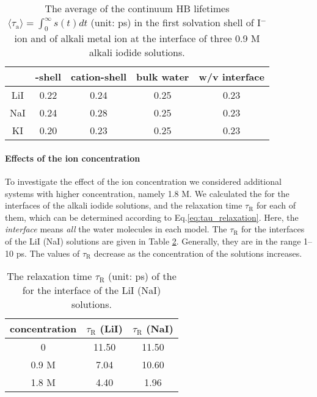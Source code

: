 %
\begin{table}[H]
\centering
\caption{\label{tab:tau_hb_alkali_iodine} 
The average of the continuum HB lifetimes $\langle\tau_{\text{a}}\rangle=\int_0^\infty s(t) dt$ (unit: ps) in the first solvation shell of I$^-$ ion 
and of alkali metal ion at the interface of three 0.9 M alkali iodide solutions.
}
\begin{tabular}{ccccc}
  &\I-shell &cation-shell & bulk water & w/v interface \\
\hline
 LiI & 0.22 & 0.24 & 0.25 & 0.23\\
 NaI & 0.24 & 0.28 & 0.25 & 0.23\\
 KI  & 0.20 & 0.23 & 0.25 &0.23\\
\end{tabular}
\end{table} 




\FloatBarrier
\paragraph{Effects of the ion concentration}
To investigate the effect of the ion concentration we considered additional systems with higher concentration, namely 1.8 M.
We calculated the \CHB for the interfaces of the alkali iodide solutions, 
and the relaxation time $\tau_{\text{R}}$ for each of them, which can be determined according to Eq.\thinspace\ref{eq:tau_relaxation}. 
Here, the \emph{interface} means \emph{all} the water molecules in each model. 
The $\tau_{\text{R}}$ for the interfaces of the LiI (NaI) solutions are given in 
Table \ref{tab:tau_hb}. Generally, they are in the range 1--10 ps. 
The values of $\tau_{\text{R}}$ decrease as the concentration of the solutions increases.
\begin{table}[htbp]
\centering
\caption{\label{tab:tau_hb} 
  The relaxation time $\tau_{\text{R}}$ (unit: ps) of the \CHB  for the interface of the LiI (NaI) solutions.}
\begin{tabular}{ccc}
  concentration  & $\tau_{\text{R}}$ (LiI) & $\tau_{\text{R}}$ (NaI) \\
\hline
  0 & 11.50 & 11.50 \\
  0.9 M & 7.04 & 10.60 \\
  1.8 M & 4.40 & 1.96 
\end{tabular}
\end{table}

